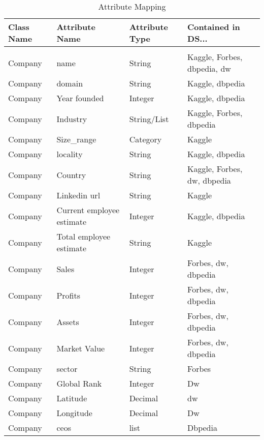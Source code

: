\documentclass[11pt,titlepage,oneside,openany]{article}
\begin{document}
\begin{table}[t]
	\small
	\label{tab:attribute-mapping}
	\begin{tabularx}{\textwidth}{llll}
		Class Name   & Attribute   Name            & Attribute Type & Contained in DS... \\\hline
		&&&\\
		Company      & name                        & String         & Kaggle, Forbes,   dbpedia, dw              \\
		Company      & domain                      & String         & Kaggle, dbpedia                            \\
		Company & Year founded                & Integer        & Kaggle, dbpedia                            \\
		Company      & Industry                    & String/List    & Kaggle, Forbes, dbpedia                    \\
		Company      & Size\_range                 & Category       & Kaggle \\
		Company      & locality                    & String         & Kaggle, dbpedia                            \\
		Company      & Country                     & String         & Kaggle, Forbes, dw,   dbpedia              \\
		Company      & Linkedin url                & String         & Kaggle                                     \\
		Company      & Current   employee estimate & Integer        & Kaggle, dbpedia                            \\
		Company      & Total employee   estimate   & String         & Kaggle                                     \\
		Company      & Sales                       & Integer        & Forbes, dw, dbpedia                        \\
		Company      & Profits                     & Integer        & Forbes, dw, dbpedia                        \\
		Company      & Assets                      & Integer        & Forbes, dw, dbpedia                        \\
		Company      & Market Value                & Integer        & Forbes, dw, dbpedia                        \\
		Company      & sector                      & String         & Forbes                                     \\
		Company      & Global Rank                 & Integer        & Dw                                         \\
		Company      & Latitude                    & Decimal        & dw                                         \\
		Company      & Longitude                   & Decimal        & Dw                                         \\
		Company      & ceos                        & list           & Dbpedia                                   
	\end{tabularx}
\caption{Attribute Mapping}
\end{table}
\end{document}
